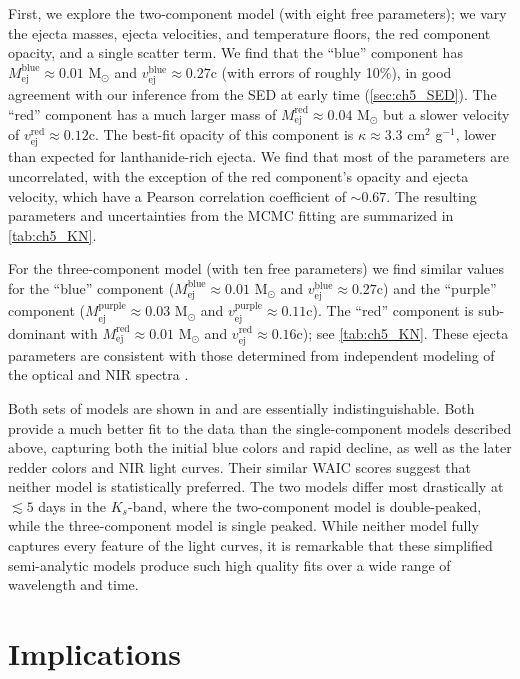 First, we explore the two-component model (with eight free parameters); we vary the ejecta masses, ejecta velocities, and temperature floors, the red component opacity, and a single scatter term. We find that the ``blue'' component has $M_\mathrm{ej}^\mathrm{blue}\approx 0.01$ M$_\odot$ and $v_\mathrm{ej}^\mathrm{blue}\approx 0.27$c (with errors of roughly 10\%), in good agreement with our inference from the SED at early time (\cref{sec:ch5_SED}). The ``red'' component has a much larger mass of $M_\mathrm{ej}^\mathrm{red}\approx 0.04$ M$_\odot$ but a slower velocity of $v_\mathrm{ej}^\mathrm{red}\approx 0.12$c. The best-fit opacity of this component is $\kappa\approx 3.3$ cm$^{2}$ g$^{-1}$, lower than expected for lanthanide-rich ejecta. We find that most of the parameters are uncorrelated, with the exception of the red component's opacity and ejecta velocity, which have a Pearson correlation coefficient of $\sim0.67$. The resulting parameters and uncertainties from the MCMC fitting are summarized in \cref{tab:ch5_KN}.

For the three-component model (with ten free parameters) we find similar values for the ``blue'' component ($M_\mathrm{ej}^\mathrm{blue}\approx 0.01$ M$_\odot$ and $v_\mathrm{ej}^\mathrm{blue}\approx 0.27$c) and the ``purple'' component ($M_\mathrm{ej}^\mathrm{purple}\approx 0.03$ M$_\odot$ and $v_\mathrm{ej}^\mathrm{purple}\approx 0.11$c).  The ``red'' component is sub-dominant with $M_\mathrm{ej}^\mathrm{red}\approx 0.01$ M$_\odot$ and $v_\mathrm{ej}^\mathrm{red}\approx 0.16$c); see \cref{tab:ch5_KN}. These ejecta parameters are consistent with those determined from independent modeling of the optical and NIR spectra \citep{Chornock+17,Nicholl+17a}.

Both sets of models are shown in  and are essentially indistinguishable.  Both provide a much better fit to the data than the single-component models described above, capturing both the initial blue colors and rapid decline, as well as the later redder colors and NIR light curves.  Their similar WAIC scores suggest that neither model is statistically preferred. The two models differ most drastically at $\lesssim 5$ days in the $K_s$-band, where the two-component model is double-peaked, while the three-component model is single peaked. While neither model fully captures every feature of the light curves, it is remarkable that these simplified semi-analytic models produce such high quality fits over a wide range of wavelength and time.

\section{Implications}
\label{sec:ch5_interpretation}

